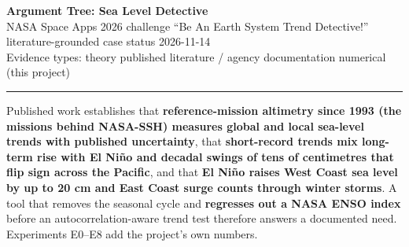 \documentclass[10pt]{article}
\newcommand{\evtag}[1]{\fbox{\scriptsize\sffamily\bfseries #1}}
\newcommand{\EvT}{\evtag{T}}
\newcommand{\EvL}{\evtag{L}}
\newcommand{\EvN}{\evtag{N}}
\begin{document}
\begin{center}
{\sffamily\LARGE\bfseries Argument Tree: Sea Level Detective}\\[4pt]
{\small NASA Space Apps 2026 \textperiodcentered{} challenge ``Be An Earth System Trend Detective!'' \textperiodcentered{}
literature-grounded case \textperiodcentered{} status 2026-11-14}\\[2pt]
{\footnotesize Evidence types:\enspace \EvT{} theory\quad \EvL{} published literature / agency documentation\quad \EvN{} numerical (this project)}
\end{center}
\vspace{-4pt}\noindent\rule{\linewidth}{0.8pt}

\begin{tcolorbox}[enhanced,sharp corners,boxrule=0.6pt,colframe=black,colback=black!5,colbacktitle=black,coltitle=white,
  title={ROOT THESIS},fonttitle=\sffamily\bfseries\footnotesize,fontupper=\small,left=5pt,right=5pt,toptitle=1pt,bottomtitle=1pt]
Published work establishes that \textbf{reference-mission altimetry since 1993 (the missions behind NASA-SSH) measures global and
local sea-level trends with published uncertainty}, that \textbf{short-record trends mix long-term rise with El Ni\~no and decadal swings
of tens of centimetres that flip sign across the Pacific}, and that \textbf{El Ni\~no raises West Coast sea level by up to 20 cm and
East Coast surge counts through winter storms}. A tool that removes the seasonal cycle and \textbf{regresses out a NASA ENSO index}
before an autocorrelation-aware trend test therefore answers a documented need. Experiments E0--E8 add the project's own numbers.
\end{tcolorbox}
\end{document}

